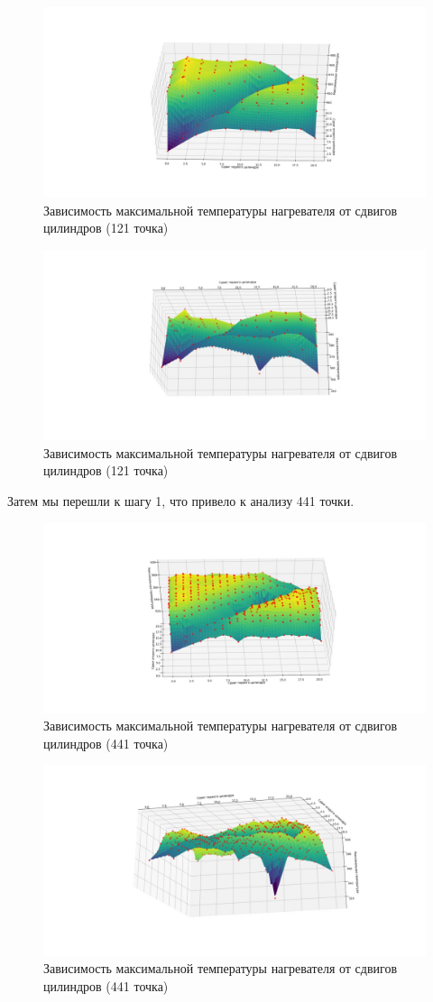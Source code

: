 \documentclass[a4paper,12pt]{article}
\theoremstyle{plain} %
\theoremstyle{definition} %
\theoremstyle{remark} %
\begin{document}
\begin{figure}[h]
	\begin{center}
		\includegraphics[width=0.4\linewidth]{images/17.1.jpg}
		\caption{Зависимость максимальной температуры нагревателя от сдвигов цилиндров (121 точка)} %
	\end{center}
\end{figure}
\begin{figure}[h]
	\begin{center}
		\includegraphics[width=0.4\linewidth]{images/17.2.jpg}
		\caption{Зависимость максимальной температуры нагревателя от сдвигов цилиндров (121 точка)} %
	\end{center}
\end{figure}

Затем мы перешли к шагу 1, что привело к анализу 441 точки.

\begin{figure}[h]
	\begin{center}
		\includegraphics[width=0.4\linewidth]{images/18.1.jpg}
		\caption{Зависимость максимальной температуры нагревателя от сдвигов цилиндров (441 точка)} %
	\end{center}
\end{figure}
\begin{figure}[h]
	\begin{center}
		\includegraphics[width=0.4\linewidth]{images/18.2.jpg}
		\caption{Зависимость максимальной температуры нагревателя от сдвигов цилиндров (441 точка)} %
	\end{center}
\end{figure}
\end{document}
